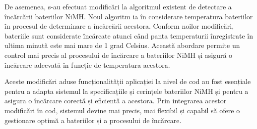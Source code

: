 De asemenea, s-au efectuat modificări la algoritmul existent de detectare a încărcării bateriilor NiMH. Noul algoritm ia în considerare temperatura bateriilor în procesul de determinare a încărcării acestora. Conform noilor modificări, bateriile sunt considerate încărcate atunci când panta temperaturii înregistrate în ultima minută este mai mare de 1 grad Celsius. Această abordare permite un control mai precis al procesului de încărcare a bateriilor NiMH și asigură o încărcare adecvată în funcție de temperatura acestora.

Aceste modificări aduse funcționalității aplicației la nivel de cod au fost esențiale pentru a adapta sistemul la specificațiile și cerințele bateriilor NiMH și pentru a asigura o încărcare corectă și eficientă a acestora. Prin integrarea acestor modificări în cod, sistemul devine mai precis, mai flexibil și capabil să ofere o gestionare optimă a bateriilor și a procesului de încărcare.
